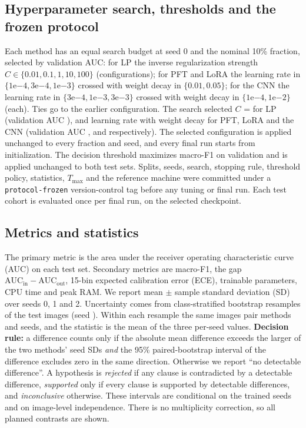 \documentclass[conference,a4paper]{IEEEtran}
\begin{document}
\subsection{Hyperparameter search, thresholds and the frozen protocol}

Each method has an equal search budget at seed 0 and the nominal 10\% fraction,
selected by validation AUC: for LP the inverse regularization strength
$C \in \{0.01, 0.1, 1, 10, 100\}$ (\valProtocolSearchLP configurations); for PFT
and LoRA the learning rate in $\{1\mathrm{e}{-4}, 3\mathrm{e}{-4},
1\mathrm{e}{-3}\}$ crossed with weight decay in $\{0.01, 0.05\}$; for the CNN
the learning rate in $\{3\mathrm{e}{-4}, 1\mathrm{e}{-3}, 3\mathrm{e}{-3}\}$
crossed with weight decay in $\{1\mathrm{e}{-4}, 1\mathrm{e}{-2}\}$
(\valProtocolSearchCNN each). Ties go to the earlier configuration. The search
selected $C$ = \valTuningLPC for LP (validation AUC \valTuningLPValAuc), and
learning rate \valTuningLoRALr with weight decay \valTuningLoRAWeightDecay for
PFT, LoRA and the CNN (validation AUC \valTuningPFTValAuc,
\valTuningLoRAValAuc and \valTuningCNNValAuc respectively). The selected
configuration is applied unchanged to every fraction and seed, and every final
run starts from initialization. The decision threshold maximizes macro-F1 on
validation and is applied unchanged to both test sets. Splits, seeds, search,
stopping rule, threshold policy, statistics, $T_{\max}$ and the reference
machine were committed under a \texttt{protocol-frozen} version-control tag
before any tuning or final run. Each test cohort is evaluated once per final
run, on the selected checkpoint.

\subsection{Metrics and statistics}

The primary metric is the area under the receiver operating characteristic curve
(AUC) on each test set. Secondary metrics are macro-F1, the gap
$\mathrm{AUC}_{\mathrm{in}} - \mathrm{AUC}_{\mathrm{out}}$, 15-bin expected
calibration error (ECE), trainable parameters, CPU time and peak RAM. We report
mean $\pm$ sample standard deviation (SD) over seeds 0, 1 and 2. Uncertainty
comes from \valProtocolBootstrapResamples class-stratified bootstrap resamples
of the test images (seed \valProtocolBootstrapSeed). Within each resample the
same images pair methods and seeds, and the statistic is the mean of the three
per-seed values. \textbf{Decision rule:} a difference counts only if the
absolute mean difference exceeds the larger of the two methods' seed SDs
\emph{and} the 95\% paired-bootstrap interval of the difference excludes zero in
the same direction. Otherwise we report ``no detectable difference''. A
hypothesis is \emph{rejected} if any clause is contradicted by a detectable
difference, \emph{supported} only if every clause is supported by detectable
differences, and \emph{inconclusive} otherwise. These intervals are conditional
on the trained seeds and on image-level independence. There is no multiplicity
correction, so all planned contrasts are shown.
\end{document}
